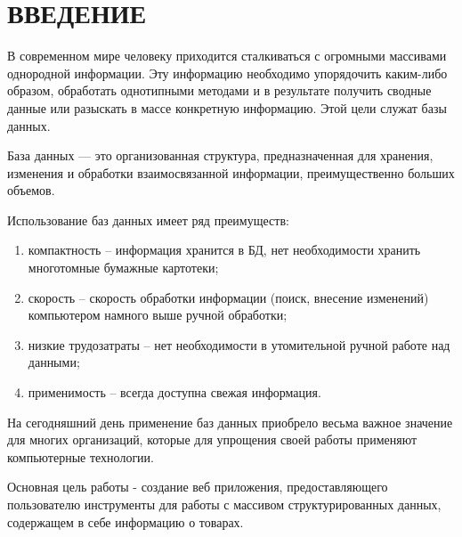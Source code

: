 \newpage

\section*{ВВЕДЕНИЕ} %

В современном мире человеку приходится сталкиваться с огромными массивами однородной информации. Эту информацию необходимо упорядочить каким-либо образом, обработать однотипными методами и в результате получить сводные данные или разыскать в массе конкретную информацию. Этой цели служат базы данных.

База данных — это организованная структура, предназначенная для хранения, изменения и обработки взаимосвязанной информации, преимущественно больших объемов.

Использование баз данных имеет ряд преимуществ:

\begin{enumerate}
    \item компактность – информация хранится в БД, нет необходимости хранить многотомные бумажные картотеки;
    \item скорость – скорость обработки информации (поиск, внесение изменений) компьютером намного выше ручной обработки;
    \item низкие трудозатраты – нет необходимости в утомительной ручной работе над данными;
    \item применимость – всегда доступна свежая информация.
\end{enumerate}

На сегодняшний день применение баз данных приобрело весьма важное значение для многих организаций, которые для упрощения своей работы применяют компьютерные технологии.

Основная цель работы - создание веб приложения, предоставляющего пользователю инструменты для работы с массивом структурированных данных,
содержащем в себе информацию о товарах.
